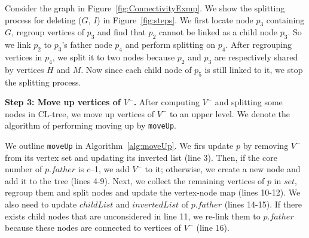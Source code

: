 \begin{example}
\label{em:steps}
Consider the graph in Figure~\ref{fig:ConnectivityExmp}.
We show the splitting process for deleting ($G$, $I$) in Figure~\ref{fig:steps}.
We first locate node $p_3$ containing $G$, regroup vertices of $p_3$ and find that $p_2$ cannot be linked as a child node $p_3$. So we link $p_2$ to $p_3$'s father node $p_4$ and perform splitting on $p_4$.
After regrouping vertices in $p_4$, we split it to two nodes because $p_2$ and $p_3$ are respectively shared by vertices $H$ and $M$.
Now since each child node of $p_5$ is still linked to it,
we stop the splitting process.
\end{example}


\textbf{Step 3: Move up vertices of $V^-$.}
After computing $V^-$ and splitting some nodes in CL-tree,
we move up vertices of $V^-$ to an upper level.
We denote the algorithm of performing moving up by {\tt moveUp}.

We outline {\tt moveUp} in Algorithm~\ref{alg:moveUp}.
We firs update $p$ by removing $V^-$ from its vertex set and updating its inverted list (line 3).
Then, if the core number of $p.father$ is $c$--1, we add $V^-$ to it;
otherwise, we create a new node and add it to the tree (lines 4-9).
Next, we collect the remaining vertices of $p$ in $set$, regroup them and split nodes and update the vertex-node map (lines 10-12).
We also need to update $childList$ and $invertedList$ of $p.father$ (lines 14-15).
If there exists child nodes that are unconsidered in line 11,
we re-link them to $p.father$ because these nodes are connected to vertices of $V^-$ (line 16).



